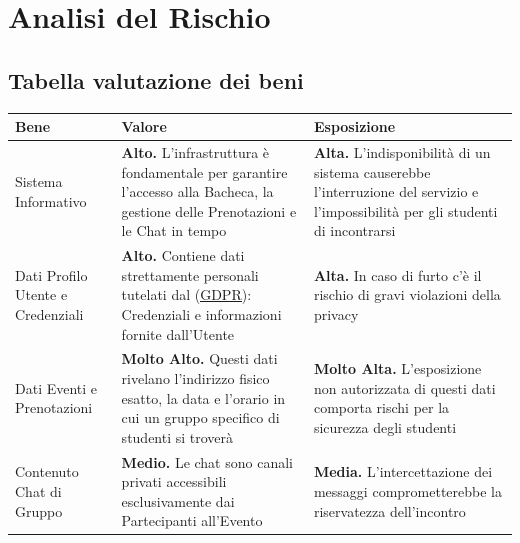 \documentclass[12pt,a4paper]{report}
\let\oldhref\href
\renewcommand{\href}[2]{\oldhref{#1}{\uline{#2}}}
\begin{document}
\newpage
\section{Analisi del Rischio}

\subsection{Tabella valutazione dei beni}
\begin{tabularx}{\textwidth}{|X|X|X|}
    \hline
    \rowcolor{studyColor} \textbf{Bene} & \textbf{Valore} & \textbf{Esposizione} \\ \hline
    \endhead
    Sistema Informativo & \textbf{Alto.} L'infrastruttura è fondamentale per garantire l'accesso alla Bacheca, la gestione delle Prenotazioni e le Chat in tempo
        & \textbf{Alta.} L'indisponibilità di un sistema causerebbe l'interruzione del servizio e l'impossibilità per gli studenti di incontrarsi \\ \hline
    Dati Profilo Utente e Credenziali & \textbf{Alto.} Contiene dati strettamente personali tutelati dal (\href{https://gdpr-info.eu/}{GDPR}): Credenziali e informazioni fornite dall'Utente 
        & \textbf{Alta.} In caso di furto c'è il rischio di gravi violazioni della privacy \\ \hline
    Dati Eventi e Prenotazioni & \textbf{Molto Alto.} Questi dati rivelano l'indirizzo fisico esatto, la data e l'orario in cui un gruppo specifico di studenti si troverà
        & \textbf{Molto Alta.} L'esposizione non autorizzata di questi dati comporta rischi per la sicurezza degli studenti \\ \hline
    Contenuto Chat di Gruppo & \textbf{Medio.} Le chat sono canali privati accessibili esclusivamente dai Partecipanti all'Evento 
        & \textbf{Media.} L'intercettazione dei messaggi comprometterebbe la riservatezza dell'incontro\\ \hline
\end{tabularx}
\end{document}
